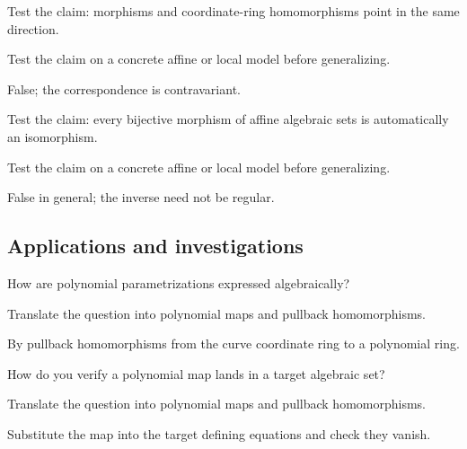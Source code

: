 \begin{exercise}\label{exr:vi04-expand-11}
Test the claim: morphisms and coordinate-ring homomorphisms point in the same direction.
\end{exercise}
\begin{hint}
Test the claim on a concrete affine or local model before generalizing.
\end{hint}
\begin{solution}
False; the correspondence is contravariant.
\end{solution}

\begin{exercise}[Bijective]\label{exr:vi04-expand-12}
Test the claim: every bijective morphism of affine algebraic sets is automatically an isomorphism.
\end{exercise}
\begin{hint}
Test the claim on a concrete affine or local model before generalizing.
\end{hint}
\begin{solution}
False in general; the inverse need not be regular.
\end{solution}

\subsection*{Applications and investigations}

\begin{exercise}\label{exr:vi04-expand-13}
How are polynomial parametrizations expressed algebraically?
\end{exercise}
\begin{hint}
Translate the question into polynomial maps and pullback homomorphisms.
\end{hint}
\begin{solution}
By pullback homomorphisms from the curve coordinate ring to a polynomial ring.
\end{solution}

\begin{exercise}\label{exr:vi04-expand-14}
How do you verify a polynomial map lands in a target algebraic set?
\end{exercise}
\begin{hint}
Translate the question into polynomial maps and pullback homomorphisms.
\end{hint}
\begin{solution}
Substitute the map into the target defining equations and check they vanish.
\end{solution}

